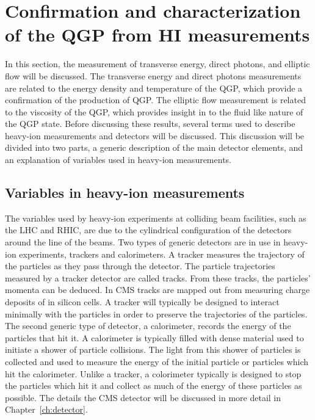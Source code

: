   \section{Confirmation and characterization of the QGP from HI measurements}
    In this section, the measurement of transverse energy, direct photons, and
      elliptic flow will be discussed.
    The transverse energy and direct photons measurements are related to 
      the energy density and temperature of the QGP, which provide a 
      confirmation of the production of QGP.
    The elliptic flow measurement is related to the viscosity of the QGP, which
      provides insight in to the fluid like nature of the QGP state.
    Before discussing these results, several terms used to describe heavy-ion
      measurements and detectors will be discussed. 
    This discussion will be divided into two parts, a generic description of 
      the main detector elements, and an explanation of variables used in
      heavy-ion measurements.
    
    \subsection{Variables in heavy-ion measurements}
      The variables used by heavy-ion experiments at colliding beam facilities, 
        such as the LHC and RHIC, are due to the cylindrical configuration of 
        the detectors around the line of the beams.
      Two types of generic detectors are in use in heavy-ion experiments, 
        trackers and calorimeters. 
      A tracker measures the trajectory of the particles as they pass through 
        the detector.
      The particle trajectories measured by a tracker detector are called 
        tracks.
      From these tracks, the particles' momenta can be deduced. 
      In CMS tracks are mapped out from measuring charge deposits of in silicon
        cells.
      A tracker will typically be designed to interact minimally with the 
        particles in order to preserve the trajectories of the particles. 
      The second generic type of detector, a calorimeter, records the energy 
        of the particles that hit it. 
      A calorimeter is typically filled with dense material used to initiate a 
        shower of particle collisions.
      The light from this shower of particles is collected and used to measure 
        the energy of the initial particle or particles which hit the 
        calorimeter.
      Unlike a tracker, a colorimeter typically is designed to stop the particles
        which hit it and collect as much of the energy of these particles as 
        possible.
      The details the CMS detector will be discussed in more detail in 
       Chapter~\ref{ch:detector}.
  
